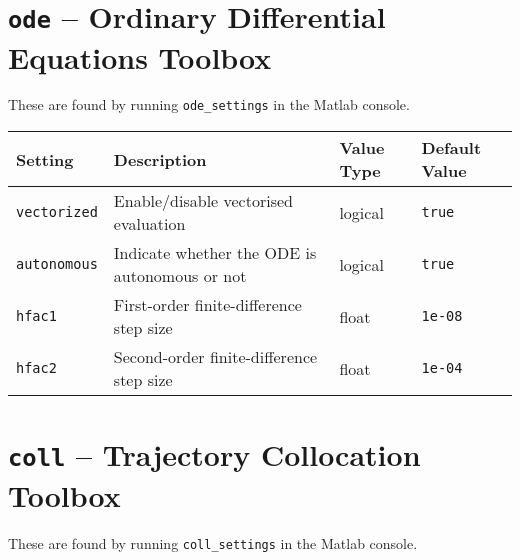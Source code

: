 \documentclass[11pt]{article}
\begin{document}
\section*{\texttt{ode} -- Ordinary Differential Equations Toolbox}

These are found by running \verb!ode_settings! in the Matlab console.

\begin{table}[h]
  \centering
  \begin{tabular}{l|l|l|l}
    \textbf{Setting}  & \textbf{Description}                          & \textbf{Value Type} & \textbf{Default Value} \\[1ex] \hline
    \verb!vectorized! & Enable/disable vectorised evaluation          & logical             & \verb!true!            \\[1ex]
    \verb!autonomous! & Indicate whether the ODE is autonomous or not & logical             & \verb!true!            \\[1ex]
    \verb!hfac1!      & First-order finite-difference step size       & float               & \verb!1e-08!           \\[1ex]
    \verb!hfac2!      & Second-order finite-difference step size      & float               & \verb!1e-04!
  \end{tabular}
\end{table}

\clearpage
\section*{\texttt{coll} -- Trajectory Collocation Toolbox}

These are found by running \verb!coll_settings! in the Matlab console.
\end{document}
